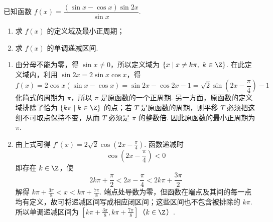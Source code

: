 \begin{problem}
已知函数 \( f(x) = \dfrac{(\sin x - \cos x)\sin 2x}{\sin x} \).
\begin{enumerate}
\item 求 \( f(x) \) 的定义域及最小正周期；
\item 求 \( f(x) \) 的单调递减区间.
\end{enumerate}
\begin{solution}
\begin{enumerate}
\item 由分母不能为零，得 \(\sin x\ne0\)，所以定义域为
\(\{x\mid x\ne k\pi,\ k\in\Z\}\). 在此定义域内，利用 \(\sin2x=2\sin x\cos x\)，得
\[
f(x)=2\cos x(\sin x-\cos x)=\sin2x-\cos2x-1
=\sqrt{2}\sin\left(2x-\frac{\pi}{4}\right)-1
\]
化简式的周期为 \(\pi\)，所以 \(\pi\) 是原函数的一个正周期. 另一方面，原函数的定义域排除了恰为 \(\{k\pi\mid k\in\Z\}\) 的点；若 \(T\) 是原函数的周期，则平移 \(T\) 必须把这组不可取点保持不变，从而 \(T\) 必须是 \(\pi\) 的整数倍. 因此原函数的最小正周期为 \(\pi\).

\item 由上式可得 \(f'(x)=2\sqrt{2}\cos\left(2x-\frac{\pi}{4}\right)\). 函数递减时
\[
\cos\left(2x-\frac{\pi}{4}\right)<0
\]
即存在 \(k\in\Z\)，使
\[
2k\pi+\frac{\pi}{2}<2x-\frac{\pi}{4}<2k\pi+\frac{3\pi}{2}
\]
解得 \(k\pi+\frac{3\pi}{8}<x<k\pi+\frac{7\pi}{8}\). 端点处导数为零，但函数在端点及其间的每一点均有定义，故可将递减区间写成相应闭区间；这些区间也不包含被排除的 \(k\pi\). 所以单调递减区间为
\(\left[k\pi+\frac{3\pi}{8},k\pi+\frac{7\pi}{8}\right]\)（\(k\in\Z\)）.
\end{enumerate}
\end{solution}
\end{problem}

